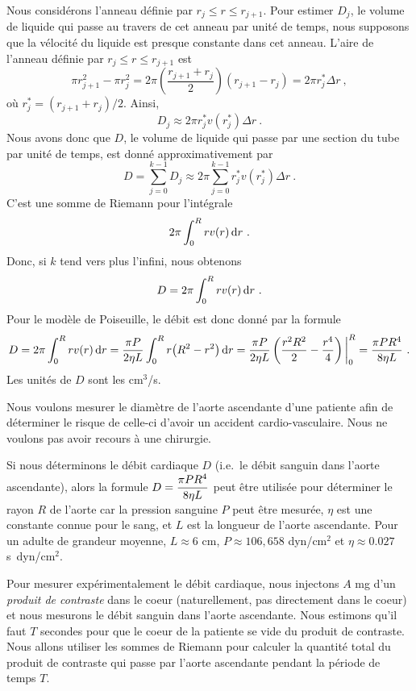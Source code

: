 {Nous considérons l'anneau définie par $r_j \leq r \leq r_{j+1}$.  Pour estimer
$D_j$, le volume de liquide qui passe au travers de cet anneau par unité de
temps, nous supposons que la vélocité du liquide est presque constante
dans cet anneau.  L'aire de l'anneau définie par
$r_j \leq r \leq r_{j+1}$ est
\[
\pi r_{j+1}^2 - \pi r_j^2 = 2\pi \left(\frac{r_{j+1}+r_j}{2} \right)
(r_{j+1}-r_j) = 2\pi r_j^\ast \Delta r \ ,
\]
où $r_j^\ast = (r_{j+1}+r_j)/2$.  Ainsi,
\[
D_j \approx 2\pi r_j^\ast v(r_j^\ast) \Delta r \ .
\]
Nous avons donc que $D$, le volume de liquide qui passe par une
section du tube par unité de temps, est donné approximativement par
\[
D = \sum_{j=0}^{k-1} D_j \approx 2\pi \sum_{j=0}^{k-1} 
r_j^\ast v(r_j^\ast) \Delta r \ .
\]
C'est une somme de Riemann pour l'intégrale
\[
2\pi \int_0^R r v(r) \,\mathrm{d}r \ .
\]
Donc, si $k$ tend vers plus l'infini, nous obtenons
\[
D = 2\pi \int_0^R r v(r) \,\mathrm{d}r \ .
\]
Pour le modèle de Poiseuille, le débit est donc donné par la formule
\[
D = 2\pi \int_0^R r v(r) \,\mathrm{d}r 
= \frac{\pi P}{2\eta L} \int_0^R r \big( R^2-r^2\big) \,\mathrm{d}r
= \frac{\pi P}{2\eta L} \left(\frac{r^2R^2}{2}-\frac{r^4}{4}\right)\bigg|_0^R
= \frac{\pi P R^4}{8\eta L} \ .
\]
Les unités de $D$ sont les cm$^3$/s.

\begin{egg}
Nous voulons mesurer le diamètre de l'aorte ascendante d'une
patiente afin de déterminer le risque de celle-ci d'avoir un accident
cardio-vasculaire.  Nous ne voulons pas avoir recours à une chirurgie.

Si nous déterminons le débit cardiaque $D$ (i.e.\ le débit sanguin
dans l'aorte ascendante), alors la formule
$\displaystyle D = \frac{\pi P  R^4}{8\eta L}$ 
peut être utilisée pour déterminer le rayon $R$ de l'aorte car la pression
sanguine $P$ peut être mesurée, $\eta$ est une constante connue pour le sang,
et $L$ est la longueur de l'aorte ascendante.  Pour un adulte de grandeur
moyenne, $L \approx 6$ cm, $P \approx 106,658$ dyn/cm$^2$ et
$\eta \approx 0.027$ \mbox{s\ dyn/cm$^2$}.

Pour mesurer expérimentalement le débit cardiaque, nous injectons $A$ mg d'un
{\em produit de contraste} dans le coeur (naturellement, pas directement dans
le coeur) et nous mesurons le débit sanguin dans l'aorte ascendante.  Nous
estimons qu'il faut $T$ secondes pour que le coeur de la patiente se
vide du produit de contraste.  Nous allons utiliser les sommes de Riemann
pour calculer la quantité total du produit de contraste qui passe par
l'aorte ascendante pendant la période de temps $T$.


\end{egg}}
